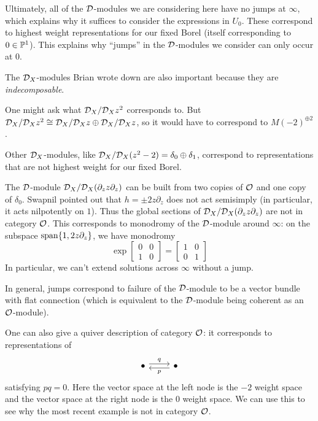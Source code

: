 \documentclass{article}
\begin{document}
Ultimately, all of the $\mathcal{D}$-modules we are considering here have no jumps at $\infty$, which explains why it suffices to consider the expressions in $U_0$.
These correspond to highest weight representations for our fixed Borel (itself corresponding to $0 \in \mathbb{P}^1$).
This explains why ``jumps'' in the $\mathcal{D}$-modules we consider can only occur at $0$.

The $\mathcal{D}_X$-modules Brian wrote down are also important because they are \emph{indecomposable}.

\begin{ex}
	One might ask what $\mathcal{D}_X / \mathcal{D}_X z^2$ corresponds to.
	But $\mathcal{D}_X / \mathcal{D}_X z^2 \cong \mathcal{D}_X / \mathcal{D}_X z \oplus \mathcal{D}_X / \mathcal{D}_X z$, so it would have to correspond to $M(-2)^{\oplus 2}$.
\end{ex}

\begin{ex}
	Other $\mathcal{D}_X$-modules, like $\mathcal{D}_X / \mathcal{D}_X (z^2 - 2) = \delta_0 \oplus \delta_1$, correspond to representations that are not highest weight for our fixed Borel.
\end{ex}

\begin{ex}
	The $\mathcal{D}$-module $\mathcal{D}_X / \mathcal{D}_X (\partial_z z \partial_z)$ can be built from two copies of $\mathcal{O}$ and one copy of $\delta_0$.
	Swapnil pointed out that $h = \pm 2z \partial_z$ does not act semisimply (in particular, it acts nilpotently on $1$).
	Thus the global sections of $\mathcal{D}_X / \mathcal{D}_X (\partial_z z \partial_z)$ are not in category $\mathcal{O}$.
	This corresponds to monodromy of the $\mathcal{D}$-module around $\infty$: on the subspace $\operatorname{span} \{ 1, 2z \partial_z \}$, we have monodromy
	\[
		\exp \begin{bmatrix}0 & 0 \\ 1 & 0\end{bmatrix} = \begin{bmatrix}1 & 0 \\ 0 & 1\end{bmatrix}
	\]
	In particular, we can't extend solutions across $\infty$ without a jump.
\end{ex}

In general, jumps correspond to failure of the $\mathcal{D}$-module to be a vector bundle with flat connection (which is equivalent to the $\mathcal{D}$-module being coherent as an $\mathcal{O}$-module).

One can also give a quiver description of category $\mathcal{O}$: it corresponds to representations of
\[
	\begin{tikzcd}
		\bullet \rar[shift left, "q"] & \bullet \lar[shift left, "p"]
	\end{tikzcd}
\]
satisfying $pq = 0$.
Here the vector space at the left node is the $-2$ weight space and the vector space at the right node is the $0$ weight space.
We can use this to see why the most recent example is not in category $\mathcal{O}$.
\end{document}
